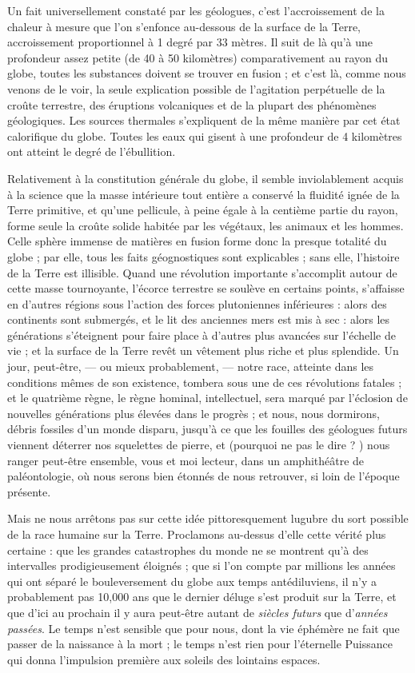 \documentclass[a4paper, 11pt, oneside, landscape]{article}
\begin{document}
Un fait universellement constaté par les géologues, c'est l'accroissement de la chaleur à mesure que l'on s'enfonce au-dessous de la surface de la Terre, accroissement proportionnel à 1 degré par 33 mètres. Il suit de là qu'à une profondeur assez petite (de 40 à 50 kilomètres) comparativement au rayon du globe, toutes les substances doivent se trouver en fusion ; et c'est là, comme nous venons de le voir, la seule explication possible de l'agitation perpétuelle de la croûte terrestre, des éruptions volcaniques et de la plupart des phénomènes géologiques. Les sources thermales s'expliquent de la même manière par cet état calorifique du globe. Toutes les eaux qui gisent à une profondeur de 4 kilomètres ont atteint le degré de l'ébullition.

Relativement à la constitution générale du globe, il semble inviolablement acquis à la science que la masse intérieure tout entière a conservé la fluidité ignée de la Terre primitive, et qu'une pellicule, à peine égale à la centième partie du rayon, forme seule la croûte solide habitée par les végétaux, les animaux et les hommes. Celle sphère immense de matières en fusion forme donc la presque totalité du globe ; par elle, tous les faits géognostiques sont explicables ; sans elle, l'histoire de la Terre est illisible. Quand une révolution importante s'accomplit autour de cette masse tournoyante, l'écorce terrestre se soulève en certains points, s'affaisse en d'autres régions sous l'action des forces plutoniennes inférieures : alors des continents sont submergés, et le lit des anciennes mers est mis à sec : alors les générations s'éteignent pour faire place à d'autres plus avancées sur l'échelle de vie ; et la surface de la Terre revêt un vêtement plus riche et plus splendide. Un jour, peut-être, --- ou mieux probablement, --- notre race, atteinte dans les conditions mêmes de son existence, tombera sous une de ces révolutions fatales ; et le quatrième règne, le règne hominal, intellectuel, sera marqué par l'éclosion de nouvelles générations plus élevées dans le progrès ; et nous, nous dormirons, débris fossiles d'un monde disparu, jusqu'à ce que les fouilles des géologues futurs viennent déterrer nos squelettes de pierre, et (pourquoi ne pas le dire ? ) nous ranger peut-être ensemble, vous et moi lecteur, dans un amphithéâtre de paléontologie, où nous serons bien étonnés de nous retrouver, si loin de l'époque présente.

Mais ne nous arrêtons pas sur cette idée pittoresquement lugubre du sort possible de la race humaine sur la Terre. Proclamons au-dessus d'elle cette vérité plus certaine : que les grandes catastrophes du monde ne se montrent qu'à des intervalles prodigieusement éloignés ; que si l'on compte par millions les années qui ont séparé le bouleversement du globe aux temps antédiluviens, il n'y a probablement pas 10,000 ans que le dernier déluge s'est produit sur la Terre, et que d'ici au prochain il y aura peut-être autant de \emph{siècles futurs} que d'\emph{années passées}. Le temps n'est sensible que pour nous, dont la vie éphémère ne fait que passer de la naissance à la mort ; le temps n'est rien pour l'éternelle Puissance qui donna l'impulsion première aux soleils des lointains espaces.
\clearpage
\end{document}
